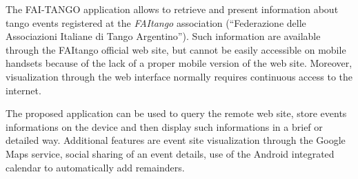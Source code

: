 \documentclass[12pt, twoside]{article}
\newcommand{\app}{FAI-TANGO }
\begin{document}
The \app application allows to retrieve and present information about
tango events registered at the \emph{FAItango} association 
(``Federazione delle Associazioni Italiane di Tango Argentino'').
Such information are available through the FAItango official web site,
but cannot be easily accessible on mobile handsets because of the lack of
a proper mobile version of the web site. 
Moreover, visualization through the web interface normally requires continuous
access to the internet.

The proposed application can be used to query the remote web site, store
events informations on the device and then display such informations in
a brief or detailed way. Additional features are event site visualization
through the Google Maps service, social sharing of an event details,
use of the Android integrated calendar to automatically add remainders.
\end{document}
